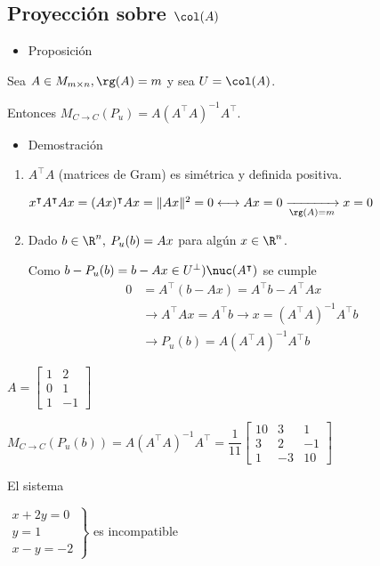 \subsection{Proyección sobre $\col(A)$}
\begin{itemize}[label=\color{red}\textbullet, leftmargin=*]
	\item \color{lightblue}Proposición
\end{itemize}
Sea $A\in M_{m\times n},\rg(A)=m$ y sea $U=\col(A)$.

Entonces $M_{C\to C}(P_u)=A(A^\intercal A)^{-1}A^\intercal$.
\begin{itemize}[label=\color{red}\textbullet, leftmargin=*]
	\item \color{lightblue}Demostración
\end{itemize}
\begin{enumerate}[label=\color{lightblue}\arabic*)]
	\item $A^\intercal A$ (matrices de Gram) es simétrica y definida positiva.
	
	$x^\intercal A^\intercal Ax=(Ax)^{\intercal}Ax=\|Ax\|^2=0\longleftrightarrow Ax=0\xrightarrow[\rg(A)=m]{}x=0$
	\item Dado $b\in\R^n,\:P_u(b)=Ax$ para algún $x\in\R^n$.
	
	Como $b-P_u(b)=b-Ax\in U^\perp)\nuc(A^\intercal)$ se cumple \begin{align*}
		0&=A^{\intercal}(b-Ax)=A^{\intercal}b-A^{\intercal}Ax\\
		&\longrightarrow A^{\intercal}Ax=A^{\intercal}b\longrightarrow x=(A^\intercal A)^{-1}A^\intercal b\\
		&\longrightarrow P_u(b)=A(A^{\intercal}A)^{-1}A^{\intercal}b
	\end{align*}
\end{enumerate}
\Ej

$A=\begin{bmatrix}
	1 & 2\\
	0 & 1\\
	1 & -1
\end{bmatrix}$

$M_{C\to C}(P_u(b))=A(A^{\intercal}A)^{-1}A^{\intercal}=\dfrac{1}{11}\begin{bmatrix}
	10 & 3 & 1 \\
	3 & 2 & -1 \\
	1 & -3 & 10
\end{bmatrix}$

El sistema 

$\left.\begin{array}{r}
	x+2y=0\\
	y=1\\
	x-y=-2
\end{array}\right\}$ es incompatible


